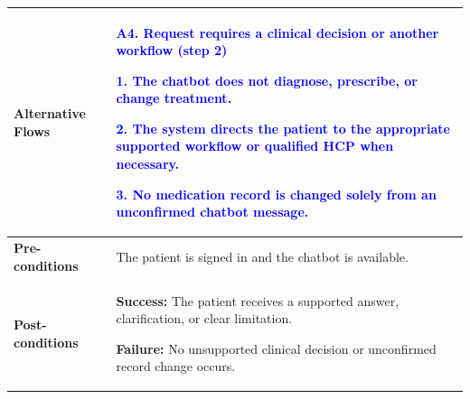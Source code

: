 \begin{longtable}{|p{}|p{}|}
\\ \hline
\textbf{Alternative Flows} &
\textcolor{blue}{\textbf{A4. Request requires a clinical decision or another workflow (step 2)}}\par
\textcolor{blue}{1. The chatbot does not diagnose, prescribe, or change treatment.}\par
\textcolor{blue}{2. The system directs the patient to the appropriate supported workflow or qualified HCP when necessary.}\par
\textcolor{blue}{3. No medication record is changed solely from an unconfirmed chatbot message.}
\\ \hline
\textbf{Pre-conditions} & The patient is signed in and the chatbot is available. \\ \hline
\textbf{Post-conditions} & \textbf{Success:} The patient receives a supported answer, clarification, or clear limitation.\par
\textbf{Failure:} No unsupported clinical decision or unconfirmed record change occurs. \\ \hline
\end{longtable}
\clearpage
